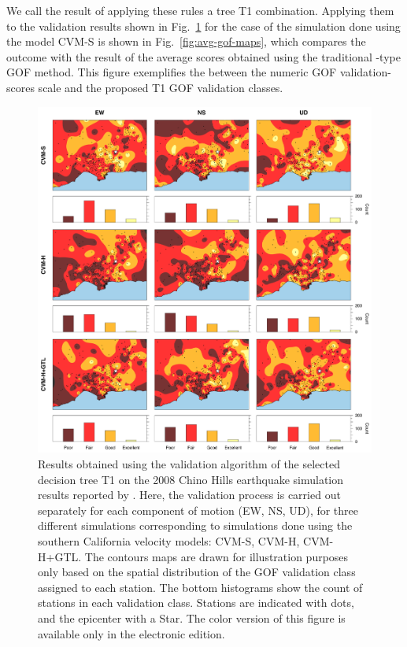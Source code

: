 We call the result of applying these rules a tree T1 combination. Applying them to the validation results shown in Fig.~\ref{fig:res-gof-maps} for the case of the simulation done using the model CVM-S is shown in Fig.~\ref{fig:avg-gof-maps}, which compares the outcome with the result of the average scores obtained using the traditional \citet{Anderson_2004_Proc}-type GOF method. This figure exemplifies the  between the numeric GOF validation-scores scale and the proposed T1 GOF validation classes.

\begin{figure}%
	\centering
	\includegraphics[width=\textwidth]{figures/pdf/figure-10}
	\caption{Results obtained using the validation algorithm of the selected decision tree T1 on the 2008 Chino Hills earthquake simulation results reported by \citet{Taborda_2014_BSSA}. Here, the validation process is carried out separately for each component of motion (EW, NS, UD), for three different simulations corresponding to simulations done using the southern California velocity models: CVM-S, CVM-H, CVM-H+GTL. The contours maps are drawn for illustration purposes only based on the spatial distribution of the GOF validation class assigned to each station. The bottom histograms show the count of stations in each validation class. Stations are indicated with dots, and the epicenter with a Star. The color version of this figure is available only in the electronic edition.}
	\label{fig:res-gof-maps}
\end{figure}

